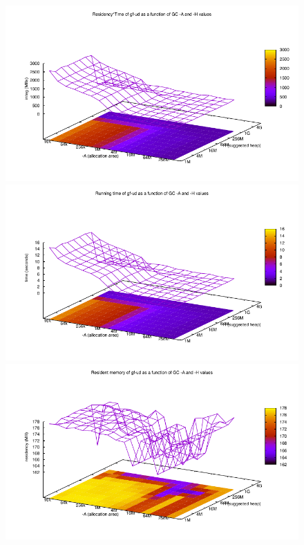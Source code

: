 \begin{figure}
    \centering
      {\includegraphics[scale=0.5]{figure/gf-ud-integ-gc-space.pdf}}
      {\includegraphics[scale=0.5]{figure/gf-ud-time-gc-space.pdf}}
      {\includegraphics[scale=0.5]{figure/gf-ud-residency-gc-space.pdf}}

\end{figure}

